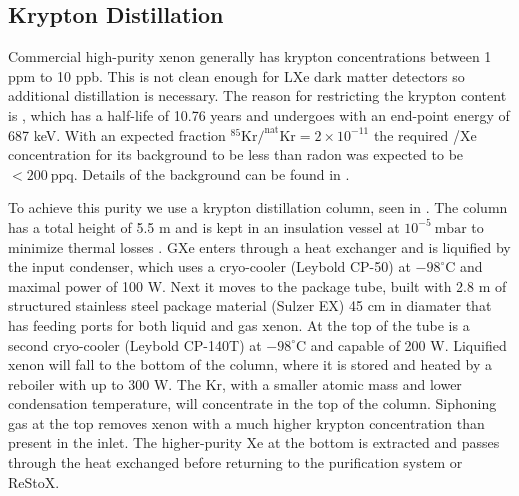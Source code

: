 \subsection{Krypton Distillation}
\label{subsec:xenon1t_kr_dist}
Commercial high-purity xenon generally has krypton concentrations between 1 ppm to 10 ppb.  This is not clean enough for LXe dark matter
detectors so additional distillation is necessary.  The reason for restricting the
krypton content is , which has a half-life of 10.76 years and undergoes \betadecay with an end-point energy of 687 keV.  With
an expected fraction $\mathrm{^{85}Kr / ^{nat}Kr = 2 \times 10^{-11}}$ the required /Xe concentration for its background to be
less than radon was expected to be $< 200\ \mathrm{ppq}$.  Details of the  background can be found in
.

To achieve this purity we use a krypton distillation column, seen in .  The column has a total
height of 5.5 m and is kept in an insulation vessel at $10^{-5}\ \mathrm{mbar}$ to minimize thermal losses .  GXe
enters through a heat exchanger and is
liquified by the input condenser, which uses a cryo-cooler (Leybold CP-50) at $-98^{\circ}\mathrm{C}$ and maximal power
of 100 W.  Next it moves to the package tube, built with 2.8 m of structured stainless steel package material (Sulzer EX) 45 cm in
diamater that has feeding ports for both liquid and gas xenon.  At the top of the tube is a second cryo-cooler (Leybold CP-140T)
at $-98^{\circ}\mathrm{C}$ and capable of 200 W.  Liquified xenon will fall to the bottom of the column, where it is stored and heated by
a reboiler with up to 300 W.  The Kr, with a smaller atomic mass and lower condensation temperature, will concentrate in the top of the
column.  Siphoning gas at the top removes xenon with a much higher krypton concentration than
present in the inlet.  The higher-purity Xe at the bottom is extracted and passes through the heat exchanged before returning to the
purification system or ReStoX.


